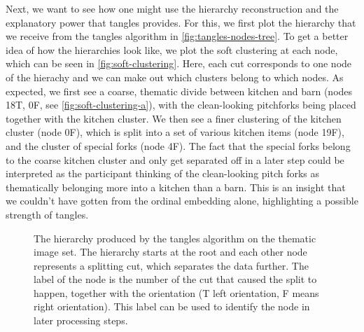 Next, we want to see how one might use the hierarchy reconstruction and the explanatory power that tangles provides. For this, we first plot the hierarchy that we receive from the tangles
algorithm in \autoref{fig:tangles-nodes-tree}. To get a better idea of how the hierarchies look like, we plot the soft clustering at each node, which
can be seen in \autoref{fig:soft-clustering}. Here, each cut corresponds to one node of the hierachy and we can make out which
clusters belong to which nodes. As expected, we first see a coarse, thematic divide between kitchen and barn (nodes 18T, 0F, see \autoref{fig:soft-clustering-a}), with 
the clean-looking pitchforks being placed together with the kitchen cluster. 
We then see a finer clustering of the kitchen cluster (node 0F), which is split into a set of various kitchen items (node 19F), and the cluster of special forks (node 4F). 
The fact that the special forks belong to the coarse kitchen cluster and only get separated off in a later step could be interpreted as the participant thinking of the 
clean-looking pitch forks as thematically belonging more into a kitchen than a barn. This is an insight that we couldn't have gotten from the ordinal embedding alone,
highlighting a possible strength of tangles.


\onecolumn
\begin{figure}[ht]
    \centering
    \caption{
        The hierarchy produced by the tangles algorithm on the thematic image set. The hierarchy starts at the root and each other node represents a splitting cut, which
        separates the data further. The label of the node is the number of the cut that caused the split to happen, together with the orientation 
        (T left orientation, F means right orientation). This label can be used to identify the node in later processing steps.
    }
    \label{fig:tangles-nodes-tree}
\end{figure}

